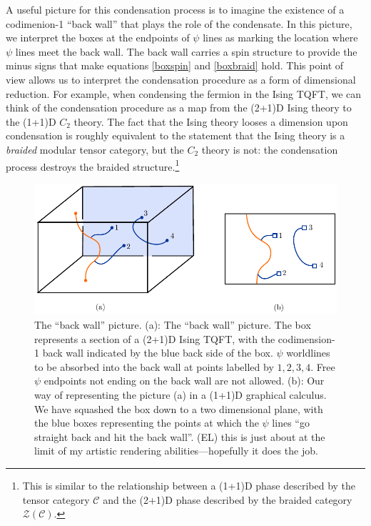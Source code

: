 \documentclass[12pt,a4paper]{article}
\newcommand{\mcz}{\mathcal{Z}}
\newcommand{\mcc}{\mathcal{C}}
\newcommand{\ethan}[1]{{\color{amethyst}\footnotesize{(EL) #1}}}
\begin{document}
A useful picture for this condensation process is to imagine the existence of a codimenion-1 ``back wall'' that plays the role of the condensate. In this picture, we interpret the boxes at the endpoints of $\psi$ lines as marking the location where $\psi$ lines meet the back wall. The back wall carries a spin structure to provide the minus signs that make equations \eqref{boxspin} and \eqref{boxbraid} hold. This point of view allows us to interpret the condensation procedure as a form of dimensional reduction. For example, when condensing the fermion in the Ising TQFT, we can think of the condensation procedure as a map from the (2+1)D Ising theory to the (1+1)D $C_2$ theory. The fact that the Ising theory looses a dimension upon condensation is roughly equivalent to the statement that the Ising theory is a {\it braided} modular tensor category, but the $C_2$ theory is not: the condensation process destroys the braided structure.\footnote{This is similar to the relationship between a (1+1)D phase described by the tensor category $\mcc$ and the (2+1)D phase described by the braided category $\mcz(\mcc)$.}

\begin{figure}
  \centering
    \includegraphics{Backwall_figure.pdf}
      \caption{The ``back wall'' picture. (a): The ``back wall'' picture. The box represents a section of a (2+1)D Ising TQFT, with the codimension-1 back wall indicated by the blue back side of the box. $\psi$ worldlines to be absorbed into the back wall at points labelled by $1,2,3,4$. Free $\psi$ endpoints not ending on the back wall are not allowed. (b): Our way of representing the picture (a) in a (1+1)D graphical calculus. We have squashed the box down to a two dimensional plane, with the blue boxes representing the points at which the $\psi$ lines ``go straight back and hit the back wall''. \ethan{this is just about at the limit of my artistic rendering abilities---hopefully it does the job.}}
\end{figure}
\end{document}
